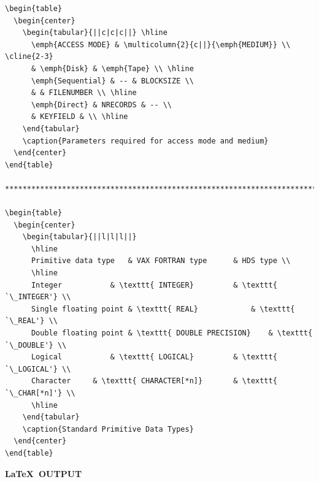 \documentclass[twoside,11pt]{article}
\begin{document}
\begin{verbatim}
\begin{table}
  \begin{center}
    \begin{tabular}{||c|c|c||} \hline
      \emph{ACCESS MODE} & \multicolumn{2}{c||}{\emph{MEDIUM}} \\ \cline{2-3}
      & \emph{Disk} & \emph{Tape} \\ \hline
      \emph{Sequential} & -- & BLOCKSIZE \\
      & & FILENUMBER \\ \hline
      \emph{Direct} & NRECORDS & -- \\
      & KEYFIELD & \\ \hline
    \end{tabular}
    \caption{Parameters required for access mode and medium}
  \end{center}
\end{table}

******************************************************************************

\begin{table}
  \begin{center}
    \begin{tabular}{||l|l|l||}
      \hline
      Primitive data type	& VAX FORTRAN type		& HDS type \\
      \hline
      Integer			& \texttt{ INTEGER}			& \texttt{ `\_INTEGER'} \\
      Single floating point	& \texttt{ REAL}			& \texttt{ `\_REAL'} \\
      Double floating point	& \texttt{ DOUBLE PRECISION}	& \texttt{ `\_DOUBLE'} \\
      Logical			& \texttt{ LOGICAL}			& \texttt{ `\_LOGICAL'} \\
      Character		& \texttt{ CHARACTER[*n]}		& \texttt{ `\_CHAR[*n]'} \\
      \hline
    \end{tabular}
    \caption{Standard Primitive Data Types}
  \end{center}
\end{table}
\end{verbatim}

\newpage

\begin{center}
  \textbf{\LaTeX\ OUTPUT}
\end{center}
\end{document}

